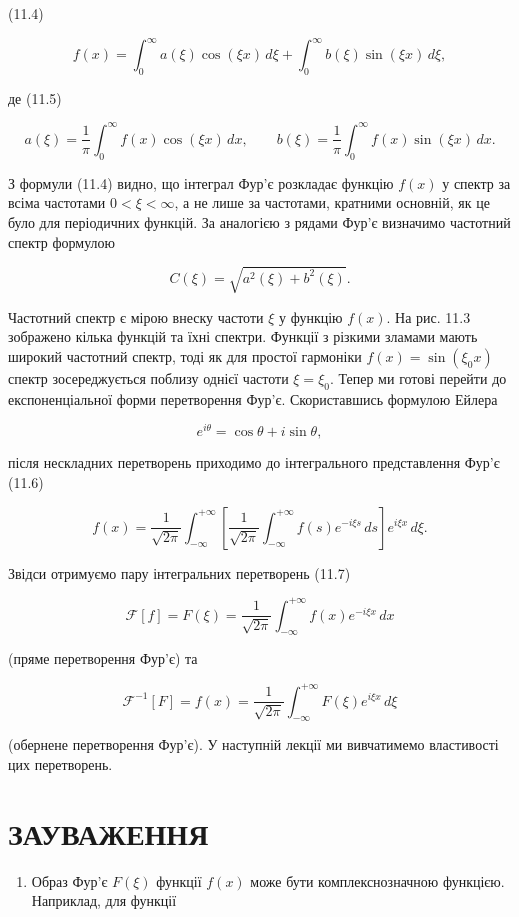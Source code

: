 \documentclass[
  ukrainian,
]{article}
\providecommand{\tightlist}{%
  \setlength{\itemsep}{0pt}\setlength{\parskip}{0pt}}
\begin{document}
(11.4)

\[
f(x) = \int_{0}^{\infty} a(\xi)\cos(\xi x)\,d\xi + \int_{0}^{\infty} b(\xi)\sin(\xi x)\,d\xi,
\]

де (11.5)

\[
a(\xi) = \frac{1}{\pi}\int_{0}^{\infty} f(x)\cos(\xi x)\,dx, \qquad b(\xi) = \frac{1}{\pi}\int_{0}^{\infty} f(x)\sin(\xi x)\,dx.
\]

З формули (11.4) видно, що інтеграл Фур'є розкладає функцію \(f(x)\) у
спектр за всіма частотами \(0<\xi<\infty\), а не лише за частотами,
кратними основній, як це було для періодичних функцій. За аналогією з
рядами Фур'є визначимо частотний спектр формулою

\[
C(\xi) = \sqrt{a^2(\xi) + b^2(\xi)}.
\]

Частотний спектр є мірою внеску частоти \(\xi\) у функцію \(f(x)\). На
рис. 11.3 зображено кілька функцій та їхні спектри. Функції з різкими
зламами мають широкий частотний спектр, тоді як для простої гармоніки
\(f(x)=\sin(\xi_0 x)\) спектр зосереджується поблизу однієї частоти
\(\xi=\xi_0\). Тепер ми готові перейти до експоненціальної форми
перетворення Фур'є. Скориставшись формулою Ейлера

\[
e^{i\theta} = \cos\theta + i\sin\theta,
\]

після нескладних перетворень приходимо до інтегрального представлення
Фур'є (11.6)

\[
f(x) = \frac{1}{\sqrt{2\pi}} \int_{-\infty}^{+\infty}
\left[\frac{1}{\sqrt{2\pi}} \int_{-\infty}^{+\infty} f(s)e^{-i\xi s}\,ds \right]
e^{i\xi x}\,d\xi.
\]

Звідси отримуємо пару інтегральних перетворень (11.7)

\[
\mathcal{F}[f] = F(\xi) = \frac{1}{\sqrt{2\pi}} \int_{-\infty}^{+\infty} f(x)e^{-i\xi x}\,dx
\]

(пряме перетворення Фур'є) та

\[
\mathcal{F}^{-1}[F] = f(x) = \frac{1}{\sqrt{2\pi}} \int_{-\infty}^{+\infty} F(\xi)e^{i\xi x}\,d\xi
\]

(обернене перетворення Фур'є). У наступній лекції ми вивчатимемо
властивості цих перетворень.

\section{ЗАУВАЖЕННЯ}\label{ux437ux430ux443ux432ux430ux436ux435ux43dux43dux44f-2}

\begin{enumerate}
\def\labelenumi{\arabic{enumi}.}
\tightlist
\item
  Образ Фур'є \(F(\xi)\) функції \(f(x)\) може бути комплекснозначною
  функцією. Наприклад, для функції
\end{enumerate}
\end{document}
